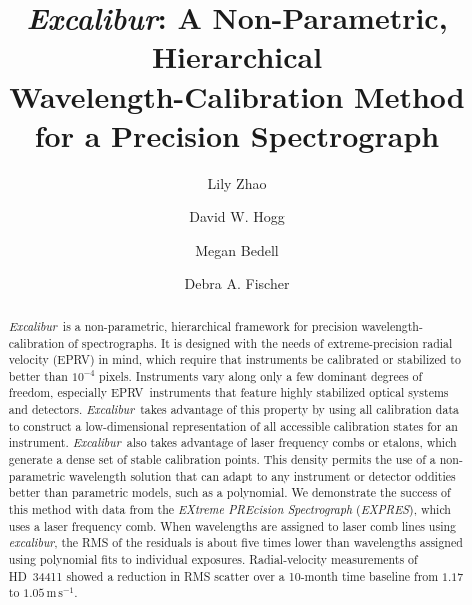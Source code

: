 \documentclass[twocolumn,table,xcolor,trackchanges]{aastex63}
\newcommand{\project}[1]{\textsl{#1}}
\newcommand{\name}{\project{excalibur}}
\newcommand{\Name}{\project{Excalibur}}
\newcommand{\acronym}[1]{{\small{#1}}}
\newcommand{\expres}{\project{\acronym{EXPRES}}}
\newcommand{\eprv}{\acronym{EPRV}}
\newcommand{\mps}{\mathrm{m\,s^{-1}}}
\begin{document}
\title{\Name:
  A Non-Parametric, Hierarchical \\
  Wavelength-Calibration Method for a Precision Spectrograph}


\author[0000-0002-3852-3590]{Lily Zhao}

\author[0000-0003-2866-9403]{David W. Hogg}

\author[0000-0001-9907-7742]{Megan Bedell}

\author[0000-0003-2221-0861]{Debra A. Fischer}

\begin{abstract}\noindent%
\Name\ is a non-parametric, hierarchical framework for precision wavelength-calibration of spectrographs.  It is designed with the needs of extreme-precision radial velocity (\eprv) in mind, which require that instruments be calibrated or stabilized to better than $10^{-4}$ pixels.  Instruments vary along only a few dominant degrees of freedom, especially \eprv\ instruments that feature highly stabilized optical systems and detectors.  \Name\ takes advantage of this property by using all calibration data to construct a low-dimensional representation of all accessible calibration states for an instrument.  \Name\ also takes advantage of laser frequency combs or etalons, which generate a dense set of stable calibration points.  This density permits the use of a non-parametric wavelength solution that can adapt to any instrument or detector oddities better than parametric models, such as a polynomial.  We demonstrate the success of this method with data from the \textsl{EXtreme PREcision Spectrograph} (\expres), which uses a laser frequency comb.  When wavelengths are assigned to laser comb lines using \name, the RMS of the residuals is about five times lower than wavelengths assigned using polynomial fits to individual exposures.  Radial-velocity measurements of HD~34411 showed a reduction in RMS scatter over a 10-month time baseline from $1.17$ to $1.05\, \mps$.
\end{abstract}
\end{document}
